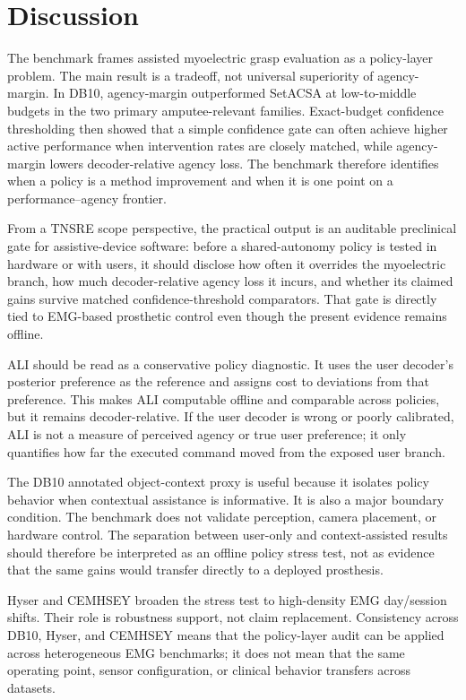 \documentclass[journal]{IEEEtran}
\begin{document}
\section{Discussion}
The benchmark frames assisted myoelectric grasp evaluation as a policy-layer problem. The main result is a tradeoff, not universal superiority of agency-margin. In DB10, agency-margin outperformed SetACSA at low-to-middle budgets in the two primary amputee-relevant families. Exact-budget confidence thresholding then showed that a simple confidence gate can often achieve higher active performance when intervention rates are closely matched, while agency-margin lowers decoder-relative agency loss. The benchmark therefore identifies when a policy is a method improvement and when it is one point on a performance--agency frontier.

From a TNSRE scope perspective, the practical output is an auditable preclinical gate for assistive-device software: before a shared-autonomy policy is tested in hardware or with users, it should disclose how often it overrides the myoelectric branch, how much decoder-relative agency loss it incurs, and whether its claimed gains survive matched confidence-threshold comparators. That gate is directly tied to EMG-based prosthetic control even though the present evidence remains offline.

ALI should be read as a conservative policy diagnostic. It uses the user decoder's posterior preference as the reference and assigns cost to deviations from that preference. This makes ALI computable offline and comparable across policies, but it remains decoder-relative. If the user decoder is wrong or poorly calibrated, ALI is not a measure of perceived agency or true user preference; it only quantifies how far the executed command moved from the exposed user branch.

The DB10 annotated object-context proxy is useful because it isolates policy behavior when contextual assistance is informative. It is also a major boundary condition. The benchmark does not validate perception, camera placement, or hardware control. The separation between user-only and context-assisted results should therefore be interpreted as an offline policy stress test, not as evidence that the same gains would transfer directly to a deployed prosthesis.

Hyser and CEMHSEY broaden the stress test to high-density EMG day/session shifts. Their role is robustness support, not claim replacement. Consistency across DB10, Hyser, and CEMHSEY means that the policy-layer audit can be applied across heterogeneous EMG benchmarks; it does not mean that the same operating point, sensor configuration, or clinical behavior transfers across datasets.
\end{document}
